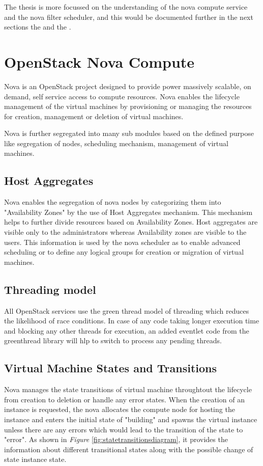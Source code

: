 The thesis is more focussed on the understanding of the nova compute service and the nova filter scheduler, and this would be documented further in the next sections the  and the .

\section{OpenStack Nova Compute}\label{sec:novacompute}
Nova is an OpenStack project designed to provide power massively scalable, on demand, self service access to compute resources.
Nova enables the lifecycle management of the virtual machines by provisioning or managing the resources for creation, management or deletion of virtual machines.

Nova is further segregated into many sub modules based on the defined purpose like segregation of nodes, scheduling mechanism, management of virtual machines.

\subsection{Host Aggregates}\label{ssec:hostaggregates}
Nova enables the segregation of nova nodes by categorizing them into "Availability Zones" by the use of Host Aggregates mechanism.
This mechanism helps to further divide resources based on Availability Zones. Host aggregates are visible only to the administrators whereas Availability zones are visible to the users. This information is used by the nova scheduler as to enable advanced scheduling or to define any logical groups for creation or migration of virtual machines.

\subsection{Threading model}\label{ssec:threadingmodel}
All OpenStack services use the green thread model of threading which reduces the likelihood of race conditions. In case of any code taking longer execution time and blocking any other threads for execution, an added eventlet code from the greenthread library will hlp to switch to process any pending threads.

\subsection{Virtual Machine States and Transitions}\label{ssec:VirtualMachineStatesTransitions}
Nova manages the state transitions of virtual machine throughtout the lifecycle from creation to deletion or handle any error states.
When the creation of an instance is requested, the nova allocates the compute node for hosting the instance and enters the initial state of "building" and spawns the virtual instance unless there are any errors which would lead to the transition of the state to "error". As shown in \textit{Figure} \ref{fig:statetransitionsdiagram}, it provides the information about different transitional states along with the possible change of state instance state.

